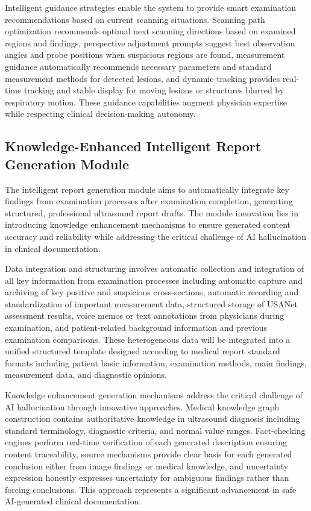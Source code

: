 Intelligent guidance strategies enable the system to provide smart examination recommendations based on current scanning situations. Scanning path optimization recommends optimal next scanning directions based on examined regions and findings, perspective adjustment prompts suggest best observation angles and probe positions when suspicious regions are found, measurement guidance automatically recommends necessary parameters and standard measurement methods for detected lesions, and dynamic tracking provides real-time tracking and stable display for moving lesions or structures blurred by respiratory motion. These guidance capabilities augment physician expertise while respecting clinical decision-making autonomy.

\subsection{Knowledge-Enhanced Intelligent Report Generation Module}

The intelligent report generation module aims to automatically integrate key findings from examination processes after examination completion, generating structured, professional ultrasound report drafts. The module innovation lies in introducing knowledge enhancement mechanisms to ensure generated content accuracy and reliability while addressing the critical challenge of AI hallucination in clinical documentation.

Data integration and structuring involves automatic collection and integration of all key information from examination processes including automatic capture and archiving of key positive and suspicious cross-sections, automatic recording and standardization of important measurement data, structured storage of USANet assessment results, voice memos or text annotations from physicians during examination, and patient-related background information and previous examination comparisons. These heterogeneous data will be integrated into a unified structured template designed according to medical report standard formats including patient basic information, examination methods, main findings, measurement data, and diagnostic opinions.

Knowledge enhancement generation mechanisms address the critical challenge of AI hallucination through innovative approaches. Medical knowledge graph construction contains authoritative knowledge in ultrasound diagnosis including standard terminology, diagnostic criteria, and normal value ranges. Fact-checking engines perform real-time verification of each generated description ensuring content traceability, source mechanisms provide clear basis for each generated conclusion either from image findings or medical knowledge, and uncertainty expression honestly expresses uncertainty for ambiguous findings rather than forcing conclusions. This approach represents a significant advancement in safe AI-generated clinical documentation.

